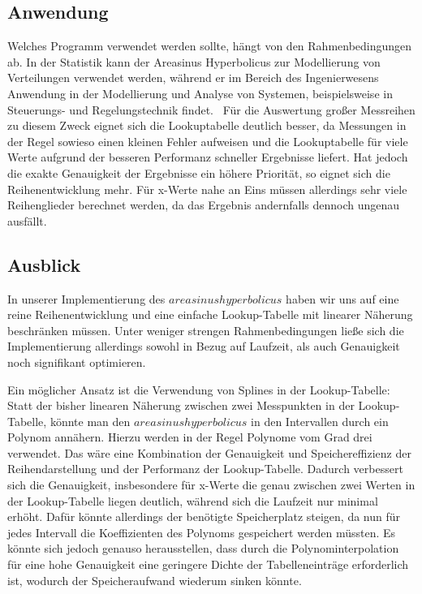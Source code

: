 \documentclass[course=erap] {aspdoc}
\begin{document}
 
     
     \subsection{Anwendung}
     Welches Programm verwendet werden sollte, hängt von den Rahmenbedingungen ab.
     In der Statistik kann der Areasinus Hyperbolicus zur Modellierung von Verteilungen verwendet werden, während er im Bereich des Ingenierwesens
     Anwendung in der Modellierung und Analyse von Systemen, beispielsweise in Steuerungs- und Regelungstechnik findet.~\cite{TODO}
     Für die Auswertung großer Messreihen zu diesem Zweck eignet sich die Lookuptabelle deutlich besser, da Messungen in der Regel sowieso einen kleinen Fehler aufweisen und die Lookuptabelle für viele Werte aufgrund der besseren Performanz schneller Ergebnisse liefert.
     Hat jedoch die exakte Genauigkeit der Ergebnisse ein höhere Priorität, so eignet sich die Reihenentwicklung mehr.
     Für x-Werte nahe an Eins müssen allerdings sehr viele Reihenglieder berechnet werden, da das Ergebnis andernfalls dennoch ungenau ausfällt.
 
     \subsection{Ausblick}
 
     In unserer Implementierung des $areasinus hyperbolicus$ haben wir uns auf eine reine Reihenentwicklung und eine einfache Lookup-Tabelle mit linearer Näherung beschränken müssen.
     Unter weniger strengen Rahmenbedingungen ließe sich die Implementierung allerdings sowohl in Bezug auf Laufzeit, als auch Genauigkeit noch signifikant optimieren. 
     
     Ein möglicher Ansatz ist die Verwendung von Splines in der Lookup-Tabelle: Statt der bisher linearen Näherung zwischen zwei Messpunkten in der Lookup-Tabelle, könnte man den $areasinus hyperbolicus$ in den Intervallen durch ein Polynom annähern.
     Hierzu werden in der Regel Polynome vom Grad drei verwendet. Das wäre eine Kombination der Genauigkeit und Speichereffizienz der Reihendarstellung und der Performanz der Lookup-Tabelle. 
     Dadurch verbessert sich die Genauigkeit, insbesondere für x-Werte die genau zwischen zwei Werten in der Lookup-Tabelle liegen deutlich, während sich die Laufzeit nur minimal erhöht.
     Dafür könnte allerdings der benötigte Speicherplatz steigen, da nun für jedes Intervall die Koeffizienten des Polynoms gespeichert werden müssten. Es könnte sich jedoch genauso herausstellen, dass durch die Polynominterpolation für eine hohe Genauigkeit eine geringere Dichte der Tabelleneinträge erforderlich ist, wodurch der Speicheraufwand wiederum sinken könnte.
\end{document}
